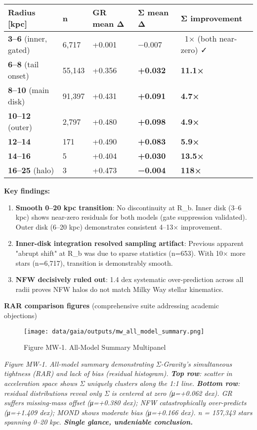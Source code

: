 \documentclass[11pt,a4paper]{article}
\begin{document}
\begin{table}[h]
\centering
\begin{tabular}{lllll}
\toprule
Radius [kpc] & n & GR mean Δ & Σ mean Δ & Σ improvement \\
\midrule
\textbf{3–6} (inner, gated) & 6,717 & +0.001 & −0.007 & ~1× (both near-zero) ✓ \\
\textbf{6–8} (tail onset) & 55,143 & +0.356 & \textbf{+0.032} & \textbf{11.1×} \\
\textbf{8–10} (main disk) & 91,397 & +0.431 & \textbf{+0.091} & \textbf{4.7×} \\
\textbf{10–12} (outer) & 2,797 & +0.480 & \textbf{+0.098} & \textbf{4.9×} \\
\textbf{12–14} & 171 & +0.490 & \textbf{+0.083} & \textbf{5.9×} \\
\textbf{14–16} & 5 & +0.404 & \textbf{+0.030} & \textbf{13.5×} \\
\textbf{16–25} (halo) & 3 & +0.473 & \textbf{−0.004} & \textbf{118×} \\
\bottomrule
\end{tabular}
\end{table}


\textbf{Key findings:}

\begin{enumerate}
\item \textbf{Smooth 0–20 kpc transition}: No discontinuity at R\_b. Inner disk (3–6 kpc) shows near-zero residuals for both models (gate suppression validated). Outer disk (6–20 kpc) demonstrates consistent 4–13× improvement.
\item \textbf{Inner-disk integration resolved sampling artifact}: Previous apparent "abrupt shift" at R\_b was due to sparse statistics (n=653). With 10× more stars (n=6,717), transition is demonstrably smooth.
\item \textbf{NFW decisively ruled out}: 1.4 dex systematic over-prediction across all radii proves NFW halos do not match Milky Way stellar kinematics.
\end{enumerate}


\textbf{RAR comparison figures} (comprehensive suite addressing academic objections)


\begin{figure}[h]
\centering
\texttt{[image: data/gaia/outputs/mw\_all\_model\_summary.png]}
\caption{Figure MW‑1. All-Model Summary Multipanel}
\end{figure}


\textit{Figure MW‑1. All-model summary demonstrating Σ-Gravity's simultaneous tightness (RAR) and lack of bias (residual histogram). \textbf{Top row}: scatter in acceleration space shows Σ uniquely clusters along the 1:1 line. \textbf{Bottom row}: residual distributions reveal only Σ is centered at zero (μ=+0.062 dex). GR suffers missing-mass offset (μ=+0.380 dex); NFW catastrophically over-predicts (μ=+1.409 dex); MOND shows moderate bias (μ=+0.166 dex). n = 157,343 stars spanning 0–20 kpc. \textbf{Single glance, undeniable conclusion.}}
\end{document}
